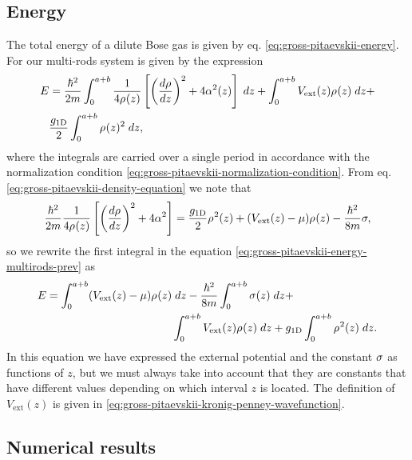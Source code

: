 \subsection{Energy}

The total energy of a dilute Bose gas is given by eq. \eqref{eq:gross-pitaevskii-energy}. For our multi-rods system is given by the expression
%
\begin{align}
	\label{eq:gross-pitaevskii-energy-multirods-prev}
	\nonumber E &= \frac{\hbar^2}{2m} \int_{0}^{a+b} \frac{1}{4 {\rho_{}}(z)} \left[
		\left(\frac{d {\rho_{}} }{dz}\right)^2 + 4 \alpha^2(z)
	\right] \; dz +
	\int_{0}^{a+b} V_{\mathrm{ext}}(z) {\rho_{}}(z) \; dz + \\
	& \frac{g_{ \mathrm{1D} }}{2} \int_{0}^{a+b} {\rho_{}}(z)^2 \; dz,
\end{align}
%
where the integrals are carried over a single period in accordance with the normalization condition
\eqref{eq:gross-pitaevskii-normalization-condition}. From eq. \eqref{eq:gross-pitaevskii-density-equation} we note
that
%
\begin{equation}
	 \frac{\hbar^2}{2m} \frac{1}{4 {\rho_{}}(z)} \left[\left(\frac{d {\rho_{}}}{dz}\right)^2 + 4 \alpha^2 \right] =
	\frac{g_{ \mathrm{1D} }}{2} {\rho_{}}^2(z) + (V_{\mathrm{ext}}(z)  - \mu) {\rho_{}}(z) - \frac{\hbar^2}{8 m} \sigma,
\end{equation}
%
so we rewrite the first integral in the equation \eqref{eq:gross-pitaevskii-energy-multirods-prev} as
%
\begin{align}
	\label{eq:gross-pitaevskii-energy-multirods}
	\nonumber E = \int_{0}^{a+b} (V_{\mathrm{ext}}(z) - \mu) {\rho_{}}(z) & \; dz -
	\frac{\hbar^2}{8m} \int_{0}^{a+b} \sigma(z) \; dz + \\
	&\int_{0}^{a+b} V_{\mathrm{ext}}(z) {\rho_{}}(z) \; dz +
	 g_{ \mathrm{1D} } \int_{0}^{a+b} {\rho_{}}^2(z) \; dz.
\end{align}
%
In this equation we have expressed the external potential and the constant $\sigma$ as functions of $z$,
but we must
always take into account that they are constants that have different values
depending on which interval $z$ is located. The definition of $V_{\mathrm{ext}}(z)$ is given in
\eqref{eq:gross-pitaevskii-kronig-penney-wavefunction}.


\subsection{Numerical results}

